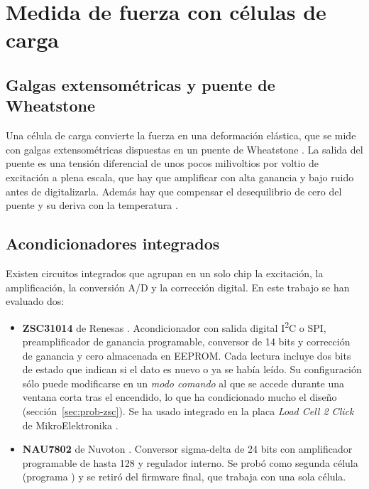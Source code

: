 \section{Medida de fuerza con células de carga}

\subsection{Galgas extensométricas y puente de Wheatstone}

Una célula de carga convierte la fuerza en una deformación elástica, que se mide con galgas
extensométricas dispuestas en un puente de Wheatstone \cite{hoffmann2012}. La salida del puente es
una tensión diferencial de unos pocos milivoltios por voltio de excitación a plena escala, que hay
que amplificar con alta ganancia y bajo ruido antes de digitalizarla. Además hay que compensar el
desequilibrio de cero del puente y su deriva con la temperatura \cite{pallas2001}.

\subsection{Acondicionadores integrados}

Existen circuitos integrados que agrupan en un solo chip la excitación, la amplificación, la
conversión A/D y la corrección digital. En este trabajo se han evaluado dos:

\begin{itemize}
  \item \textbf{ZSC31014} de Renesas \cite{zsc31014}. Acondicionador con salida digital
        I\textsuperscript{2}C o SPI, preamplificador de ganancia programable, conversor de 14 bits y
        corrección de ganancia y cero almacenada en EEPROM. Cada lectura incluye dos bits de
        estado que indican si el dato es nuevo o ya se había leído. Su configuración sólo puede
        modificarse en un \emph{modo comando} al que se accede durante una ventana corta tras el
        encendido, lo que ha condicionado mucho el diseño (sección~\ref{sec:prob-zsc}). Se ha usado
        integrado en la placa \emph{Load Cell 2 Click} de MikroElektronika \cite{mikroelc2}.
  \item \textbf{NAU7802} de Nuvoton \cite{nau7802}. Conversor sigma-delta de 24 bits con
        amplificador programable de hasta 128 y regulador interno. Se probó como segunda célula
        (programa ) y se retiró del firmware final, que trabaja con
        una sola célula.
\end{itemize}

